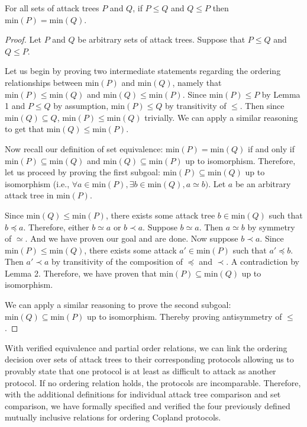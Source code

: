 \documentclass[runningheads]{llncs}
\theoremstyle{definition}
\begin{document}
\begin{theorem}
  For all sets of attack trees $P$ and $Q$, if $P \le Q$ and $Q \le P$ then $\text{min}(P) = \text{min}(Q)$. 
\end{theorem}
\begin{proof}
  Let $P$ and $Q$ be arbitrary sets of attack trees. Suppose that $P \le Q$ and $Q \le P$. 
  
  Let us begin by proving two intermediate statements regarding the ordering relationships between $\text{min}(P)$ and $\text{min}(Q)$, namely that $\text{min}(P) \leq \text{min}(Q)$ and $\text{min}(Q) \leq \text{min}(P)$. Since $\text{min}(P) \leq P$ by Lemma 1 and $P \leq Q$ by assumption, $\text{min}(P) \leq Q$ by transitivity of $\leq$. Then since $\text{min}(Q) \subseteq Q$, $\text{min}(P) \leq \text{min}(Q)$ trivially. We can apply a similar reasoning to get that $\text{min}(Q) \leq \text{min}(P)$.

  Now recall our definition of set equivalence: $\text{min}(P) = \text{min}(Q)$ if and only if $\text{min}(P) \subseteq \text{min}(Q)$ and $\text{min}(Q) \subseteq \text{min}(P)$ up to isomorphism. Therefore, let us proceed by proving the first subgoal: $\text{min}(P) \subseteq \text{min}(Q)$ up to isomorphism (i.e., $\forall a \in \text{min}(P), \exists b \in \text{min}(Q), a \simeq b)$.  Let $a$ be an arbitrary attack tree in $\text{min}(P)$. 

  Since $\text{min}(Q) \leq \text{min}(P)$, there exists some attack tree $b \in \text{min}(Q)$ such that $b \preceq a$. Therefore, either $b \simeq a$ or $b \prec a$. Suppose $b \simeq a$. Then $a \simeq b$ by symmetry of $\simeq$. And we have proven our goal and are done. Now suppose $b \prec a$. Since $\text{min}(P) \leq \text{min}(Q)$, there exists some attack $a' \in \text{min}(P)$ such that $a' \preceq b$. Then $a' \prec a$ by transitivity of the composition of $\preceq$ and $\prec$. A contradiction by Lemma 2. Therefore, we have proven that $\text{min}(P) \subseteq \text{min}(Q)$ up to isomorphism.
  
  We can apply a similar reasoning to prove the second subgoal: $\text{min}(Q) \subseteq \text{min}(P)$ up to isomorphism. Thereby proving antisymmetry of $\leq$.
\end{proof}


With verified equivalence and partial order relations, we can link the ordering decision over sets of attack trees to their corresponding protocols allowing us to provably state that one protocol is at least as difficult to attack as another protocol. If no ordering relation holds, the protocols are incomparable. Therefore, with the additional definitions for individual attack tree comparison and set comparison, we have formally specified and verified the four previously defined mutually inclusive relations for ordering Copland protocols. 
\end{document}
